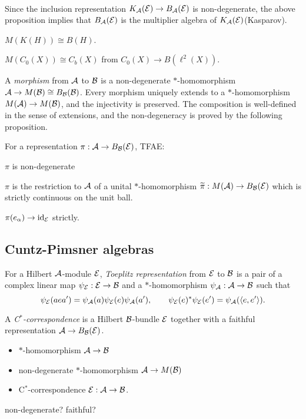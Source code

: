 \documentclass{../../../small}
\begin{document}
\begin{ex}\,
\begin{parts}
\item
Since the inclusion representation $K_{\mathcal{A}}(\mathcal{E})\to B_{\mathcal{A}}(\mathcal{E})$ is non-degenerate, the above proposition implies that $B_{\mathcal{A}}(\mathcal{E})$ is the multiplier algebra of $K_{\mathcal{A}}(\mathcal{E})$(Kasparov).
\item $M(K(H))\cong B(H)$.
\item $M(C_0(X))\cong C_b(X)$ from $C_0(X)\to B(\ell^2(X))$.
\end{parts}
\end{ex}

\begin{defn}
A \emph{morphism} from $\mathcal{A}$ to $\mathcal{B}$ is a non-degenerate $*$-homomorphism $\mathcal{A}\to M(\mathcal{B})\cong B_{\mathcal{B}}(\mathcal{B})$.
Every morphism uniquely extends to a $*$-homomorphism $M(\mathcal{A})\to M(\mathcal{B})$, and the injectivity is preserved.
The composition is well-defined in the sense of extensions, and the non-degeneracy is proved by the following proposition.
\end{defn}
\begin{lem}
For a representation $\pi:\mathcal{A}\to B_{\mathcal{B}}(\mathcal{E})$, TFAE:
\begin{parts}
\item $\pi$ is non-degenerate
\item $\pi$ is the restriction to $\mathcal{A}$ of a unital $*$-homomorphism $\widetilde\pi:M(\mathcal{A})\to B_{\mathcal{B}}(\mathcal{E})$ which is strictly continuous on the unit ball.
\item $\pi(e_\alpha)\to\operatorname{id}_{\mathcal{E}}$ strictly.
\end{parts}
\end{lem}








\subsection{Cuntz-Pimsner algebras}


\begin{defn}
For a Hilbert $\mathcal{A}$-module $\mathcal{E}$, \emph{Toeplitz representation} from $\mathcal{E}$ to $\mathcal{B}$ is a pair of a complex linear map $\psi_{\mathcal{E}}:\mathcal{E}\to\mathcal{B}$ and a $*$-homomorphism $\psi_{\mathcal{A}}:\mathcal{A}\to\mathcal{B}$ such that
\[\psi_{\mathcal{E}}(aea')=\psi_{\mathcal{A}}(a)\psi_{\mathcal{E}}(e)\psi_{\mathcal{A}}(a'),\qquad\psi_{\mathcal{E}}(e)^*\psi_{\mathcal{E}}(e')=\psi_{\mathcal{A}}(\langle e,e'\rangle).\]
\end{defn}

\begin{defn}[C$^*$-correspondences]
A \emph{C$^*$-correspondence} is a Hilbert $\mathcal{B}$-bundle $\mathcal{E}$ together with a faithful representation $\mathcal{A}\to B_{\mathcal{B}}(\mathcal{E})$.
\end{defn}
\begin{itemize}
\item $*$-homomorphism $\mathcal{A}\to\mathcal{B}$
\item non-degenerate $*$-homomorphism $\mathcal{A}\to M(\mathcal{B})$
\item C$^*$-correspondence $\mathcal{E}:\mathcal{A}\to\mathcal{B}$.
\end{itemize}
non-degenerate? faithful?
\end{document}
